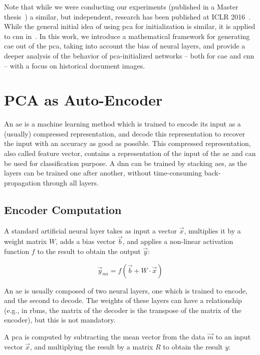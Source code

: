\documentclass[conference]{IEEEtran}
\begin{document}
Note that while we were conducting our experiments (published in a Master thesis~\cite{alberti2016}) a similar, but independent, research has been published at ICLR 2016~\cite{krahenbuhl2015data}.
While the general initial idea of using \ac{pca} for initialization is similar, it is applied to \ac{cnn} in~\cite{krahenbuhl2015data}.
In this work, we introduce a mathematical framework for generating \ac{cae} out of the \ac{pca}, taking into account the bias of neural layers, and provide a deeper analysis of the behavior of \ac{pca}-initialized networks -- both for \ac{cae} and \ac{cnn} -- with a focus on historical document images.

\section{PCA as Auto-Encoder}\label{sct:methodology}
An \ac{ae} is a machine learning method which is trained to encode its input as a (usually) compressed representation, and decode this representation to recover the input with an accuracy as good as possible.
This compressed representation, also called feature vector, contains a representation of the input of the \ac{ae} and can be used for classification purpose.
A \ac{dnn} can be trained by stacking \acp{ae}, as the layers can be trained one after another, without time-consuming back-propagation through all layers.

\subsection{Encoder Computation}

A standard artificial neural layer takes as input a vector $\vec{x}$, multiplies it by a weight matrix $W$, adds a bias vector $\vec{b}$, and applies a non-linear activation function $f$ to the result to obtain the output $\vec{y}$:

\begin{equation}\label{eq:layer}
  \vec{y}_{nn} = f\left(\vec{b} + W\cdot \vec{x}\right)
\end{equation}

An \ac{ae} is usually composed of two neural layers, one which is trained to encode, and the second to decode.
The weights of these layers can have a relationship (e.g., in \acp{rbm}, the matrix of the decoder is the transpose of the matrix of the encoder), but this is not mandatory.

A \ac{pca} is computed by subtracting the mean vector from the data $\vec{m}$ to an input vector $\vec{x}$, and multiplying the result by a matrix $R$ to obtain the result $y$:
\end{document}
